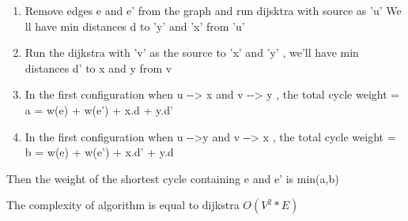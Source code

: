 \documentclass[11pt]{article}
\begin{document}
\begin{enumerate}
\def\labelenumi{\arabic{enumi}.}
\item
  Remove edges e and e' from the graph and run dijsktra with source as
  'u' We ll have min distances d to 'y' and 'x' from 'u'
\item
  Run the dijkstra with 'v' as the source to 'x' and 'y' , we'll have
  min distances d' to x and y from v
\item
  In the first configuration when u -\/-\textgreater{} x and v
  -\/-\textgreater{} y , the total cycle weight = a = w(e) + w(e') + x.d
  + y.d'
\item
  In the first configuration when u -\/-\textgreater{}y and v
  -\/-\textgreater{} x , the total cycle weight = b = w(e) + w(e') +
  x.d' + y.d
\end{enumerate}

Then the weight of the shortest cycle containing e and e' is min(a,b)

The complexity of algorithm is equal to dijkstra \(O(V^2*E)\)
\end{document}
